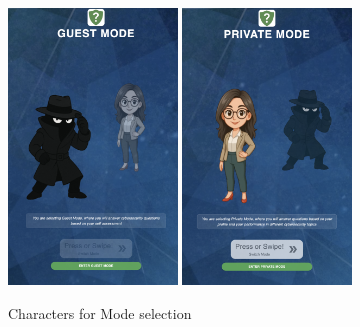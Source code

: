 \begin{figure}[H]
    \centering
    \includegraphics[width=0.4\textwidth]{images/MainScreenCharacter1.png}
    \includegraphics[width=0.4\textwidth]{images/MainScreenCharacter2.png}
    \caption{Characters for Mode selection}
\end{figure}
